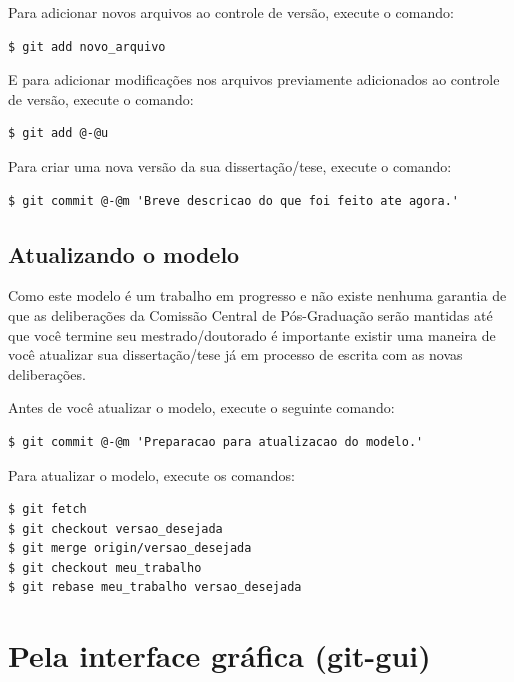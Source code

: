 Para adicionar novos arquivos ao controle de versão, execute o comando:
\begin{lstlisting}
$ git add novo_arquivo
\end{lstlisting}
E para adicionar modificações nos arquivos previamente adicionados ao controle
de versão, execute o comando:
\begin{lstlisting}[escapechar=@]
$ git add @-@u
\end{lstlisting}

Para criar uma nova versão da sua dissertação/tese, execute o comando:
\begin{lstlisting}[escapechar=@]
$ git commit @-@m 'Breve descricao do que foi feito ate agora.'
\end{lstlisting}

\subsection{Atualizando o modelo}
Como este modelo é um trabalho em progresso e não existe nenhuma garantia de que
as deliberações da Comissão Central de Pós-Graduação serão mantidas até que você
termine seu mestrado/doutorado é importante existir uma maneira de você
atualizar sua dissertação/tese já em processo de escrita com as novas
deliberações.

Antes de você atualizar o modelo, execute o seguinte comando:
\begin{lstlisting}[escapechar=@]
$ git commit @-@m 'Preparacao para atualizacao do modelo.'
\end{lstlisting}
Para atualizar o modelo, execute os comandos:
\begin{lstlisting}
$ git fetch
$ git checkout versao_desejada
$ git merge origin/versao_desejada
$ git checkout meu_trabalho
$ git rebase meu_trabalho versao_desejada
\end{lstlisting}

\section{Pela interface gráfica (git-gui)}
